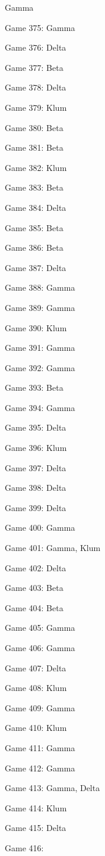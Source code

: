 \documentclass{article}
\begin{document}
\begin{multicols}{3}
\begin{compactitem}
Gamma
\item Game 375:
Gamma
\item Game 376:
Delta
\item Game 377:
Beta
\item Game 378:
Delta
\item Game 379:
Klum
\item Game 380:
Beta
\item Game 381:
Beta
\item Game 382:
Klum
\item Game 383:
Beta
\item Game 384:
Delta
\item Game 385:
Beta
\item Game 386:
Beta
\item Game 387:
Delta
\item Game 388:
Gamma
\item Game 389:
Gamma
\item Game 390:
Klum
\item Game 391:
Gamma
\item Game 392:
Gamma
\item Game 393:
Beta
\item Game 394:
Gamma
\item Game 395:
Delta
\item Game 396:
Klum
\item Game 397:
Delta
\item Game 398:
Delta
\item Game 399:
Delta
\item Game 400:
Gamma
\item Game 401:
Gamma, Klum
\item Game 402:
Delta
\item Game 403:
Beta
\item Game 404:
Beta
\item Game 405:
Gamma
\item Game 406:
Gamma
\item Game 407:
Delta
\item Game 408:
Klum
\item Game 409:
Gamma
\item Game 410:
Klum
\item Game 411:
Gamma
\item Game 412:
Gamma
\item Game 413:
Gamma, Delta
\item Game 414:
Klum
\item Game 415:
Delta
\item Game 416:

\end{compactitem}
\end{multicols}
\end{document}
